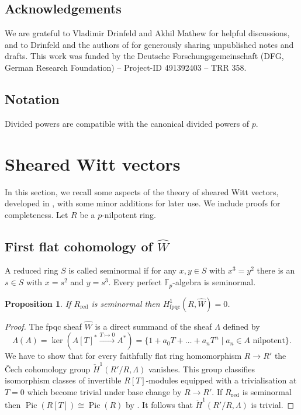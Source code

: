 \documentclass[a4paper,11pt]{amsart}
\theoremstyle{plain}
\newtheorem{Prop}[equation]{Proposition}
\theoremstyle{definition}
\theoremstyle{remark}
\newcommand{\bPr}{\begin{Prop}}
\newcommand{\ePr}{\end{Prop}}
\newcommand{\bproof}{\begin{proof}}
\newcommand{\eproof}{\end{proof}}
\numberwithin{equation}{section}
\newcommand{\FF}{{\mathbb{F}}}
\DeclareMathOperator{\fpqc}{fpqc}
\DeclareMathOperator{\red}{red}
\DeclareMathOperator{\Pic}{Pic}
\newcommand{\cclearpage}{}%
\begin{document}
\subsection{Acknowledgements}

We are grateful to Vladimir Drinfeld and Akhil Mathew for helpful discussions, and to Drinfeld and the authors of \cite{BMVZ} for generously sharing unpublished notes and drafts.
This work was 
funded by the Deutsche Forschungsgemeinschaft (DFG, German Research
Foundation) -- Project-ID 491392403 -- TRR 358.

\subsection{Notation}

Divided powers are compatible with the canonical divided powers of $p$.


\cclearpage
\section{Sheared Witt vectors}
\label{Se:Sheard-Witt-vect}

In this section, we recall some aspects of the theory of sheared Witt vectors, developed in \cite{Drinfeld:Ring-stacks-conjecturally, BMVZ}, with some minor additions for later use. 
We include proofs for completeness.
Let $R$ be a $p$-nilpotent ring.

\subsection{First flat cohomology of $\hat W$}

A reduced ring $S$ is called seminormal if for any $x,y\in S$ with $x^3=y^2$ there is an $s\in S$ with $x=s^2$ and $y=s^3$. Every perfect $\FF_p$-algebra is seminormal.

\bPr
\label{Pr:H^1-hatW-seminormal}
If $R_{\red}$ is seminormal then $H^1_{\fpqc}(R,\hat W)=0$.
\ePr

\bproof
The fpqc sheaf $\hat W$ is a direct summand of the sheaf $\Lambda$ defined by
\[
\Lambda(A)=\ker(A[T]^*\xrightarrow{T\mapsto 0} A^*)=\{1+a_0T+\ldots+a_nT^n\mid a_n\in A\text{ nilpotent}\}.
\]
We have to show that for every faithfully flat ring homomorphism $R\to R'$ the \v Cech cohomology group $\check H^1(R'/R,\Lambda)$ vanishes. This group classifies isomorphism classes of invertible $R[T]$-modules equipped with a trivialisation at $T=0$ which become trivial under base change by $R\to R'$. If $R_{\red}$ is seminormal then $\Pic(R[T])\cong\Pic(R)$ by \cite[Chap.~I, Theorem 3.11]{Weibel:K-Book}. It follows that $\check H^1 (R'/R,\Lambda)$ is trivial.
\eproof
\end{document}
